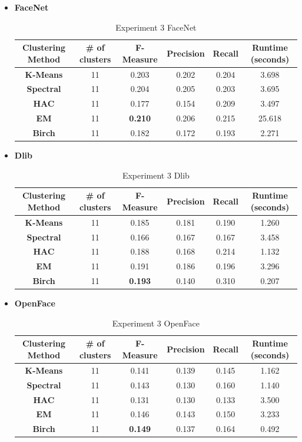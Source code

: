 \documentclass[12pt,english]{article}
\begin{document}
\begin{itemize}

\item \textbf{FaceNet}
\begin{table}[H]
\centering
\begin{tabular}{||c c c c c c||} 
 \hline
 Clustering Method & \# of clusters & F-Measure & Precision & Recall & Runtime (seconds)\\ [0.5ex]
 \hline\hline
 \textbf{K-Means} & 11 & 0.203 & 0.202 & 0.204 & 3.698\\ 
 \hline
  \textbf{Spectral} & 11 & 0.204 & 0.205 & 0.203 & 3.695\\
 \hline
 \textbf{HAC} & 11 & 0.177 & 0.154 & 0.209 & 3.497\\
 \hline
 \textbf{EM} & 11 & \textbf{0.210} & 0.206 & 0.215 & 25.618\\
 \hline
 \textbf{Birch} & 11 & 0.182 & 0.172 & 0.193 & 2.271\\
 \hline
\end{tabular}
\caption{Experiment 3 FaceNet}
\label{table:ex3facenet}
\end{table}

\item \textbf{Dlib}
\begin{table}[H]
\centering
\begin{tabular}{||c c c c c c||} 
 \hline
 Clustering Method & \# of clusters & F-Measure & Precision & Recall & Runtime (seconds)\\ [0.5ex]
 \hline\hline
 \textbf{K-Means} & 11 & 0.185 & 0.181 & 0.190 & 1.260\\ 
 \hline
  \textbf{Spectral} & 11 & 0.166 & 0.167 & 0.167 & 3.458\\
 \hline
 \textbf{HAC} & 11 & 0.188 & 0.168 & 0.214 & 1.132\\
 \hline
 \textbf{EM} & 11 & 0.191 & 0.186 & 0.196 & 3.296\\
 \hline
 \textbf{Birch} & 11 & \textbf{0.193} & 0.140 & 0.310 & 0.207\\
 \hline
\end{tabular}
\caption{Experiment 3 Dlib}
\label{table:ex3dlib}
\end{table}

\item \textbf{OpenFace}
\begin{table}[H]
\centering
\begin{tabular}{||c c c c c c||} 
 \hline
 Clustering Method & \# of clusters & F-Measure & Precision & Recall & Runtime (seconds)\\ [0.5ex]
 \hline\hline
 \textbf{K-Means} & 11 & 0.141 & 0.139 & 0.145 & 1.162\\ 
 \hline
  \textbf{Spectral} & 11 & 0.143 & 0.130 & 0.160 & 1.140\\
 \hline
 \textbf{HAC} & 11 & 0.131 & 0.130 & 0.133 & 3.500\\
 \hline
 \textbf{EM} & 11 & 0.146 & 0.143 & 0.150 & 3.233\\
 \hline
 \textbf{Birch} & 11 & \textbf{0.149} & 0.137 & 0.164 & 0.492\\
 \hline
\end{tabular}
\caption{Experiment 3 OpenFace}
\label{table:ex3openface}
\end{table}


\end{itemize}
\end{document}
